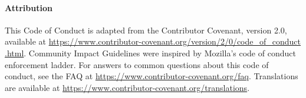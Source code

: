 \paragraph{Attribution}
This Code of Conduct is adapted from the Contributor Covenant,
version 2.0, available at
\href{https://www.contributor-covenant.org/version/2/0/code_of_conduct.html}{https://www.contributor-covenant.org/version/2/0/code\_of\_conduct .html}.
Community Impact Guidelines were inspired by
Mozilla’s code of conduct enforcement ladder.
For answers to common questions about this code of conduct, see the FAQ at
\href{https://www.contributor-covenant.org/faq}{https://www.contributor-covenant.org/faq}. Translations are available
at \href{https://www.contributor-covenant.org/translations}{https://www.contributor-covenant.org/translations}.

